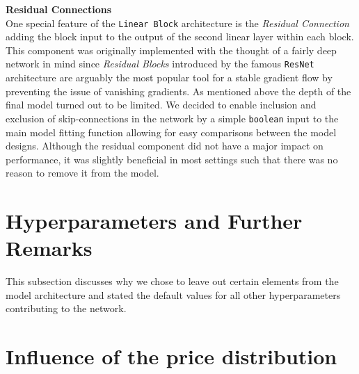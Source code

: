 \documentclass[12pt, letterpaper]{article}
\begin{document}
\textbf{Residual Connections} \\
One special feature of the \texttt{Linear Block} architecture is the \emph{Residual Connection} adding the block input to the output of the second linear layer within each block.
This component was originally implemented with the thought of a fairly deep network in mind since \emph{Residual Blocks} introduced by the famous \texttt{ResNet} architecture are arguably the most popular tool for a stable gradient flow by preventing the issue of vanishing gradients.
As mentioned above the depth of the final model turned out to be limited.
We decided to enable inclusion and exclusion of skip-connections in the network by a simple \texttt{boolean} input to the main model fitting function allowing for easy comparisons between the model designs.
Although the residual component did not have a major impact on performance, it was slightly beneficial in most settings such that there was no reason to remove it from the model.


\section{Hyperparameters and Further Remarks}

This subsection discusses why we chose to leave out certain elements from the model architecture and stated the default values for all other hyperparameters contributing to the network.




\section{Influence of the price distribution}



\newpage



\end{document}
